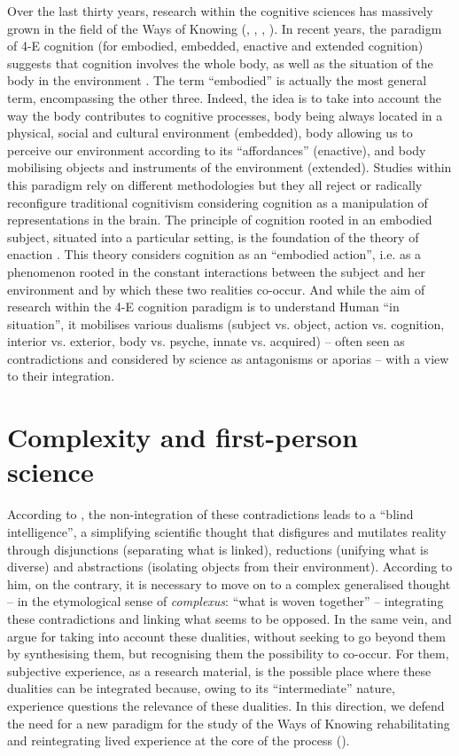 \documentclass[output=paper]{langscibook}
\begin{document}
Over the last thirty years, research within the cognitive sciences has massively grown in the field of the Ways of Knowing (\citealt{Suchman1987}, \citealt{VarelaEtAl1991}, \citealt{Hutchins1995}, \citealt{Clark1997}). In recent years, the paradigm of 4-E cognition (for embodied, embedded, enactive and extended cognition) suggests that cognition involves the whole body, as well as the situation of the body in the environment \citep{NewendeBruinGallagher2018}. The term “embodied” is actually the most general term, encompassing the other three. Indeed, the idea is to take into account the way the body contributes to cognitive processes, body being always located in a physical, social and cultural environment (embedded), body allowing us to perceive our environment according to its “affordances” (enactive), and body mobilising objects and instruments of the environment (extended). Studies within this paradigm rely on different methodologies but they all reject or radically reconfigure traditional cognitivism considering cognition as a manipulation of representations in the brain. The principle of cognition rooted in an embodied subject, situated into a particular setting, is the foundation of the theory of enaction \citep{VarelaEtAl1991}. This theory considers cognition as an “embodied action”, i.e. as a phenomenon rooted in the constant interactions between the subject and her environment and by which these two realities co-occur. And while the aim of research within the 4-E cognition paradigm is to understand Human “in situation”, it mobilises various dualisms (subject vs. object, action vs. cognition, interior vs. exterior, body vs. psyche, innate vs. acquired) -- often seen as contradictions and considered by science as antagonisms or aporias -- with a view to their integration.

\section{Complexity and first-person science}

According to \citet{Morin1990Introduction}, the non-integration of these contradictions leads to a “blind intelligence”, a simplifying scientific thought that disfigures and mutilates reality through disjunctions (separating what is linked), reductions (unifying what is diverse) and abstractions (isolating objects from their environment). According to him, on the contrary, it is necessary to move on to a complex generalised thought -- in the etymological sense of \textit{complexus}: “what is woven together” -- integrating these contradictions and linking what seems to be opposed. In the same vein, \citet{VarelaEtAl1991} and \citet{DeprazEtAl2003} argue for taking into account these dualities, without seeking to go beyond them by synthesising them, but recognising them the possibility to co-occur. For them, subjective experience, as a research material, is the possible place where these dualities can be integrated because, owing to its “intermediate” nature,  experience questions the relevance of these dualities. In this direction, we defend the need for a new paradigm for the study of the Ways of Knowing rehabilitating and reintegrating lived experience at the core of the process (\citealt{PetitmenginEtAl2015}).
\end{document}
